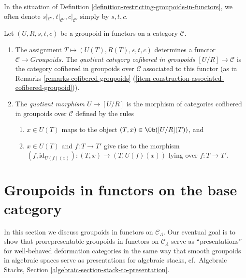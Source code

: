 \begin{remark}
\label{remark-notation-restriction}
In the situation of Definition
\ref{definition-restricting-groupoids-in-functors}, we often denote
$s|_{\mathcal{C}'}, t|_{\mathcal{C}'}, c|_{\mathcal{C}'}$ simply by $s, t, c$.
\end{remark}

\begin{definition}
\label{definition-quotient}
Let $(U, R, s, t, c)$ be a groupoid in functors on a category $\mathcal{C}$.
\begin{enumerate}
\item The assignment $T \mapsto  (U(T), R(T), s, t, c)$ determines a functor
$\mathcal{C} \to \textit{Groupoids}$. The {\it quotient category
cofibered in groupoids $[U/R] \to \mathcal{C}$} is the category
cofibered in groupoids over $\mathcal{C}$ associated to this functor (as in
Remarks \ref{remarks-cofibered-groupoids}
(\ref{item-construction-associated-cofibered-groupoid})).
\item The {\it quotient morphism $U \to [U/R]$} is the morphism of
categories cofibered in groupoids over $\mathcal{C}$ defined by the
rules
\begin{enumerate}
\item $x \in U(T)$ maps to the object $(T, x) \in \Ob([U/R](T))$, and
\item $x \in U(T)$ and $f : T \to T'$ give rise to the morphism
$(f, \text{id}_{U(f)(x)}): (T, x) \to (T, U(f)(x))$ lying over
$f : T \to T'$.
\end{enumerate}
\end{enumerate}
\end{definition}





\section{Groupoids in functors on the base category}
\label{section-prorepresentable-groupoids-in-functors}

\noindent
In this section we discuss groupoids in functors on $\mathcal{C}_\Lambda$.
Our eventual goal is to show that prorepresentable groupoids
in functors on $\mathcal{C}_\Lambda$ serve as ``presentations''
for well-behaved deformation categories in the same way that
smooth groupoids in algebraic spaces serve as presentations for
algebraic stacks,
cf.\ Algebraic Stacks, Section \ref{algebraic-section-stack-to-presentation}.

